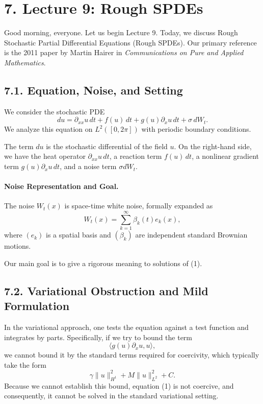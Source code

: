\documentclass[11pt]{article}
\theoremstyle{definition}
\theoremstyle{remark}
\begin{document}
\section*{7. Lecture 9: Rough SPDEs}
Good morning, everyone. Let us begin Lecture 9. Today, we discuss Rough Stochastic Partial Differential Equations (Rough SPDEs). Our primary reference is the 2011 paper by Martin Hairer in \emph{Communications on Pure and Applied Mathematics}.

\subsection*{7.1. Equation, Noise, and Setting}
We consider the stochastic PDE
\begin{equation}
du
=
\partial_{xx}u\,dt
+f(u)\,dt
+g(u)\partial_x u\,dt
+\sigma\,dW_t.
\tag{1}
\end{equation}
We analyze this equation on $L^2([0,2\pi])$ with periodic boundary conditions.

The term $du$ is the stochastic differential of the field $u$. On the right-hand side, we have the heat operator $\partial_{xx}u\,dt$, a reaction term $f(u)\,dt$, a nonlinear gradient term $g(u)\partial_xu\,dt$, and a noise term $\sigma dW_t$.

\paragraph{Noise Representation and Goal.}
The noise $W_t(x)$ is space-time white noise, formally expanded as
\[
W_t(x)=\sum_{k=1}^{\infty}\beta_k(t)e_k(x),
\]
where $(e_k)$ is a spatial basis and $(\beta_k)$ are independent standard Brownian motions.

Our main goal is to give a rigorous meaning to solutions of (1).

\subsection*{7.2. Variational Obstruction and Mild Formulation}
In the variational approach, one tests the equation against a test function and integrates by parts. Specifically, if we try to bound the term
\[
\langle g(u)\partial_xu,u\rangle,
\]
we cannot bound it by the standard terms required for coercivity, which typically take the form
\[
\gamma\|u\|_{H^1}^2+M\|u\|_{L^2}^2+C.
\]
Because we cannot establish this bound, equation (1) is not coercive, and consequently, it cannot be solved in the standard variational setting.
\end{document}
